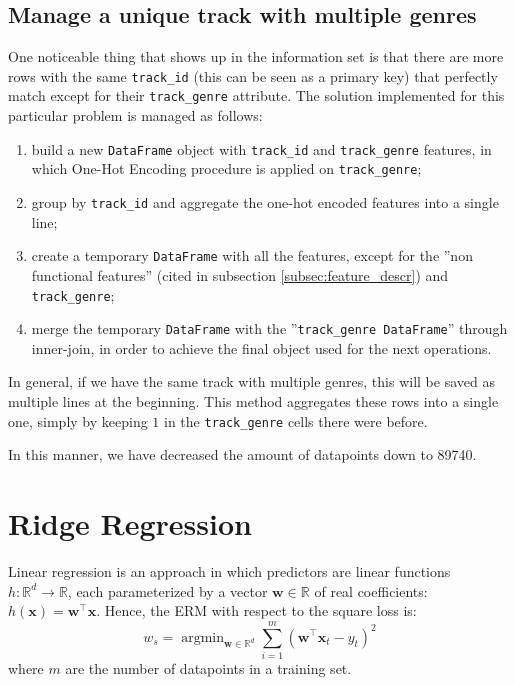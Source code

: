 \documentclass{article}
\DeclareMathOperator*{\argmin}{argmin}
\begin{document}
\subsection{Manage a unique track with multiple genres}
\label{subsec:track_genre}
One noticeable thing that shows up in the information set is that there are more rows with the same \texttt{track\_id} (this can be seen as a primary key) that perfectly match except for their \texttt{track\_genre} attribute. 
The solution implemented for this particular problem is managed as follows:
\begin{enumerate}
	\item build a new \texttt{DataFrame} object with \texttt{track\_id} and \texttt{track\_genre} features, in which One-Hot Encoding procedure is applied on \texttt{track\_genre}; 
	\item group by \texttt{track\_id} and aggregate the one-hot encoded features into a single line;
	\item create a temporary \texttt{DataFrame} with all the features, except for the ''non functional features'' (cited in subsection \ref{subsec:feature_descr}) and \texttt{track\_genre};
	\item merge the temporary \texttt{DataFrame} with the ''\texttt{track\_genre DataFrame}'' through inner-join, in order to achieve the final object used for the next operations.
	              
\end{enumerate}
In general, if we have the same track with multiple genres, this will be saved as multiple lines at the beginning. This method aggregates these rows into a single one, simply by keeping $1$ in the \texttt{track\_genre} cells there were before. 
    
In this manner, we have decreased the amount of datapoints down to 89740.
    

\section{Ridge Regression}
Linear regression is an approach in which predictors are linear functions $h: \mathbb{R}^d \rightarrow \mathbb{R}$, each parameterized by a vector $\boldsymbol{w} \in \mathbb{R}$ of real coefficients: $h(\boldsymbol{x}) = \boldsymbol{w}^\top\boldsymbol{x}$. Hence, the ERM with respect to the square loss is: \begin{equation}
w_s = \argmin_{\boldsymbol{w} \in \mathbb{R}^d}\sum_{i = 1}^m(\boldsymbol{w}^\top \boldsymbol{x}_t - y_t)^2
\end{equation}
where $m$ are the number of datapoints in a training set.
    
\end{document}
